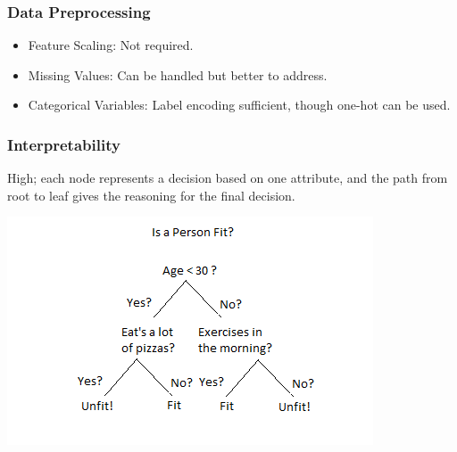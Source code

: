 \documentclass[english, threecolumn]{latex4ei/latex4ei_sheet}
\begin{document}
\begin{sectionbox}
\subsubsection{Data Preprocessing}
\begin{itemize}
    \item Feature Scaling: Not required.
    \item Missing Values: Can be handled but better to address.
    \item Categorical Variables: Label encoding sufficient, though one-hot can be used.
\end{itemize}

\subsubsection{Interpretability}
High; each node represents a decision based on one attribute, and the path from root to leaf gives the reasoning for the final decision.

\includegraphics[width=0.5\linewidth]{cheat_sheets//img/Decision-Trees-modified-1.png}
\end{sectionbox}
\end{document}
